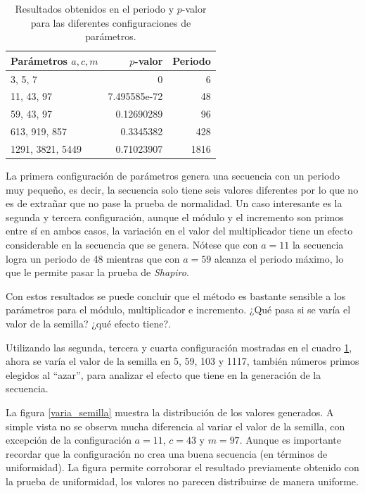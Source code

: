\documentclass[12pt]{article}
\begin{document}
	\begin{table}[b]
		\centering
		\caption{Resultados obtenidos en el periodo y $p$-valor para las diferentes configuraciones de parámetros.}
		\label{resultados_primos}
		\begin{tabular}{lrr}
			\hline
			Parámetros $a, c, m$ & $p$-valor & Periodo\\
			\hline
			3, 5, 7 & 0 & 6 \\
			11, 43, 97 & 7.495585e-72 & 48 \\
			59, 43, 97 & 0.12690289 & 96 \\
			613, 919, 857 & 0.3345382 & 428 \\
			1291, 3821, 5449 & 0.71023907  & 1816 \\
			\hline
		\end{tabular}
	\end{table}

	La primera configuración de parámetros genera una secuencia con un periodo muy pequeño, es decir, la secuencia solo tiene seis valores diferentes por lo que no es de extrañar que no pase la prueba de normalidad. Un caso interesante es la segunda y tercera configuración, aunque el módulo y el incremento son primos entre sí en ambos casos, la variación en el valor del multiplicador tiene un efecto considerable en la secuencia que se genera. Nótese que con $a=11$ la secuencia logra un periodo de 48 mientras que con $a=59$ alcanza el periodo máximo, lo que le permite pasar la prueba de {\em Shapiro}.
	
	Con estos resultados se puede concluir que el método es bastante sensible a los parámetros para el módulo, multiplicador e incremento. ¿Qué pasa si se varía el valor de la semilla? ¿qué efecto tiene?.
	
	Utilizando las segunda, tercera y cuarta configuración mostradas en el cuadro \ref{resultados_primos}, ahora se varía el valor de la semilla en 5, 59, 103 y 1117, también números primos elegidos al ``azar'', para analizar el efecto que tiene en la generación de la secuencia.
	
	La figura \ref{varia_semilla} muestra la distribución de los valores generados. A simple vista no se observa mucha diferencia al variar el valor de la semilla, con excepción de la configuración $a=11$, $c= 43$ y $m=97$. Aunque es importante recordar que la configuración no crea una buena secuencia (en términos de uniformidad). La figura permite corroborar el resultado previamente obtenido con la prueba de uniformidad, los valores no parecen distribuirse de manera uniforme.
	
\end{document}
